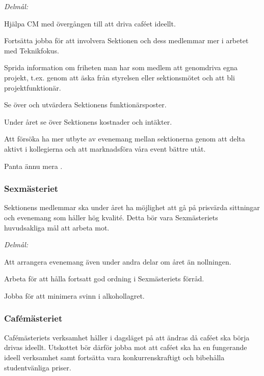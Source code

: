 \documentclass[../_main/handlingar.tex]{subfiles}
\begin{document}
\emph{Delmål:}
\begin{dashlist}
	\item Hjälpa CM med övergången till att driva caféet ideellt.
	\item Fortsätta jobba för att involvera Sektionen och dess medlemmar mer i arbetet med Teknikfokus.
	\item Sprida information om friheten man har som medlem att genomdriva egna projekt, t.ex. genom att äska från styrelsen eller sektionsmötet och att bli projektfunktionär.
	\item Se över och utvärdera Sektionens funktionärsposter.
	\item Under året se över Sektionens kostnader och intäkter.
	\item Att försöka ha mer utbyte av evenemang mellan sektionerna genom att delta aktivt i kollegierna och att marknadsföra våra event bättre utåt.
	\item Panta ännu mera \scalebox{0.4}{\recycle}.
\end{dashlist}

\subsubsection*{Sexmästeriet}
Sektionens medlemmar ska under året ha möjlighet att gå på prisvärda sittningar och evenemang som håller hög kvalité. Detta bör vara Sexmästeriets huvudsakliga mål att arbeta mot.

\emph{Delmål:}
\begin{dashlist}
	\item Att arrangera evenemang även under andra delar om året än nollningen.
	\item Arbeta för att hålla fortsatt god ordning i Sexmästeriets förråd.
	\item Jobba för att minimera svinn i alkohollagret.
\end{dashlist}

\newpage

\subsubsection*{Cafémästeriet}
Cafémästeriets verksamhet håller i dagsläget på att ändras då caféet ska börja drivas ideellt. Utskottet bör därför jobba mot att caféet ska ha en fungerande ideell verksamhet samt fortsätta vara konkurrenskraftigt och bibehålla studentvänliga priser.
\end{document}
